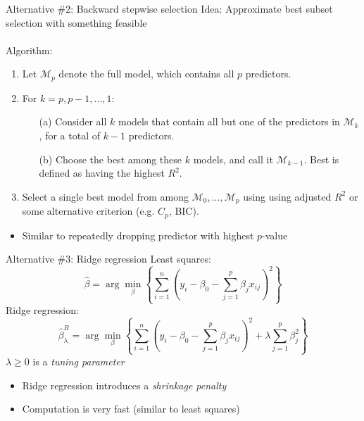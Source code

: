 \documentclass{beamer}
\begin{document}
  \begin{frame}{Alternative \#2: Backward stepwise selection}
    Idea: Approximate best subset selection with something feasible\\
    ~\\
    Algorithm:
    \begin{enumerate}
      \item Let $\mathcal{M}_p$ denote the full model, which contains all $p$ predictors.
      \item For $k = p, p-1, ..., 1$:
      \begin{itemize}
        \item[(a)] Consider all $k$ models that contain all but one of the predictors in $\mathcal{M}_k$, for a total of $k-1$ predictors.
        \item[(b)] Choose the best among these $k$ models, and call it $\mathcal{M}_{k-1}$. Best is defined as having the highest $R^2$.
      \end{itemize}
      \item Select a single best model from among $\mathcal{M}_0, ..., \mathcal{M}_p$ using using adjusted $R^2$ or some alternative criterion (e.g. $C_p$, BIC).
    \end{enumerate}
    \begin{itemize}
      \item Similar to repeatedly dropping predictor with highest $p$-value
    \end{itemize}
  \end{frame}

  \begin{frame}{Alternative \#3: Ridge regression}
    Least squares:
    $$\hat\beta = \arg\min_\beta \left\{ \sum_{i = 1}^n \left(y_i - \beta_0 - \sum_{j = 1}^p \beta_j x_{ij}\right)^2 \right\}$$
    Ridge regression:
    $$\hat\beta^R_\lambda = \arg\min_\beta \left\{ \sum_{i = 1}^n \left(y_i - \beta_0 - \sum_{j = 1}^p \beta_j x_{ij}\right)^2 + \lambda \sum_{j = 1}^p \beta_j^2 \right\}$$
    \hfill $\lambda \ge 0$ is a {\it tuning parameter}
    \begin{itemize}
      \item Ridge regression introduces a {\it shrinkage penalty}
      \item Computation is very fast (similar to least squares)
    \end{itemize}
  \end{frame}
\end{document}
